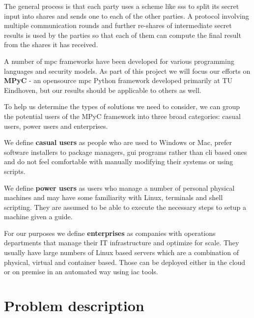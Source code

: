 The general process is that each party uses a scheme like \gls{sss}
\autocite{shamirHowShareSecret1979} to split its secret input into
shares and sends one to each of the other parties. A protocol involving
multiple communication rounds and further re-shares of intermediate
secret results is used by the parties so that each of them can compute
the final result from the shares it has received.

A number of \gls{mpc} frameworks have been developed for various
programming languages and security models. As part of this project we
will focus our efforts on \textbf{MPyC}\autocite{mpycHome,mpycSource} -
an opensource \gls{mpc} Python framework developed primarily at TU
Eindhoven, but our results should be applicable to others as well.

To help us determine the types of solutions we need to consider, we can
group the potential users of the MPyC framework into three broad
categories: casual users, power users and enterprises.

We define \textbf{casual users} as people who are used to Windows or
Mac, prefer software installers to package managers, \gls{gui} programs
rather than \gls{cli} based ones and do not feel comfortable with
manually modifying their systems or using scripts.

We define \textbf{power users} as users who manage a number of personal
physical machines and may have some familiarity with Linux, terminals
and shell scripting. They are assumed to be able to execute the
necessary steps to setup a machine given a guide.

For our purposes we define \textbf{enterprises} as companies with
operations departments that manage their IT infrastructure and optimize
for scale. They usually have large numbers of Linux based servers which
are a combination of physical, virtual and container based. Those can be
deployed either in the cloud or on premise in an automated way using
\gls{iac} tools.

\hypertarget{problem-description}{%
\section{Problem description}\label{problem-description}}

